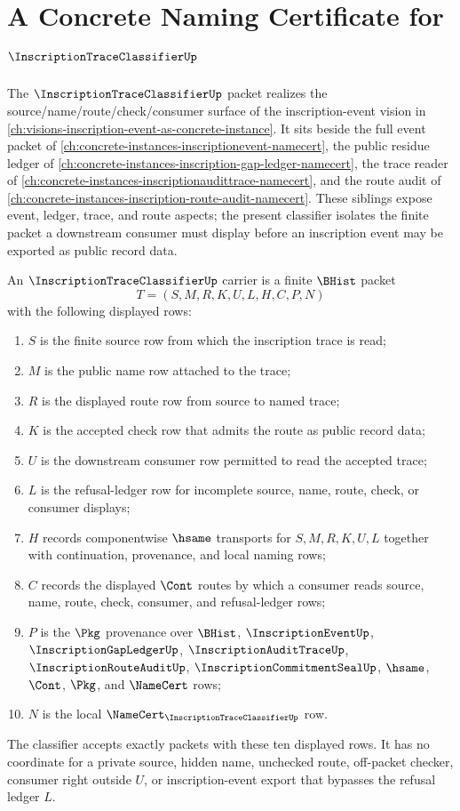 \chapter{A Concrete Naming Certificate for $\InscriptionTraceClassifierUp$}
\label{ch:concrete-instances-inscription-trace-classifier-namecert}

The $\InscriptionTraceClassifierUp$ packet realizes the source/name/route/check/consumer surface of the inscription-event vision in \autoref{ch:visions-inscription-event-as-concrete-instance}. It sits beside the full event packet of \autoref{ch:concrete-instances-inscriptionevent-namecert}, the public residue ledger of \autoref{ch:concrete-instances-inscription-gap-ledger-namecert}, the trace reader of \autoref{ch:concrete-instances-inscriptionaudittrace-namecert}, and the route audit of \autoref{ch:concrete-instances-inscription-route-audit-namecert}. These siblings expose event, ledger, trace, and route aspects; the present classifier isolates the finite packet a downstream consumer must display before an inscription event may be exported as public record data.

\begin{definition}
\label{def:inscription-trace-classifier-carrier}
An $\InscriptionTraceClassifierUp$ carrier is a finite $\BHist$ packet
$$
T=(S,M,R,K,U,L,H,C,P,N)
$$
with the following displayed rows:
\begin{enumerate}
\item $S$ is the finite source row from which the inscription trace is read;
\item $M$ is the public name row attached to the trace;
\item $R$ is the displayed route row from source to named trace;
\item $K$ is the accepted check row that admits the route as public record data;
\item $U$ is the downstream consumer row permitted to read the accepted trace;
\item $L$ is the refusal-ledger row for incomplete source, name, route, check, or consumer displays;
\item $H$ records componentwise $\hsame$ transports for $S,M,R,K,U,L$ together with continuation, provenance, and local naming rows;
\item $C$ records the displayed $\Cont$ routes by which a consumer reads source, name, route, check, consumer, and refusal-ledger rows;
\item $P$ is the $\Pkg$ provenance over $\BHist$, $\InscriptionEventUp$, $\InscriptionGapLedgerUp$, $\InscriptionAuditTraceUp$, $\InscriptionRouteAuditUp$, $\InscriptionCommitmentSealUp$, $\hsame$, $\Cont$, $\Pkg$, and $\NameCert$ rows;
\item $N$ is the local $\NameCert_{\InscriptionTraceClassifierUp}$ row.
\end{enumerate}
The classifier accepts exactly packets with these ten displayed rows. It has no coordinate for a private source, hidden name, unchecked route, off-packet checker, consumer right outside $U$, or inscription-event export that bypasses the refusal ledger $L$.
\end{definition}

